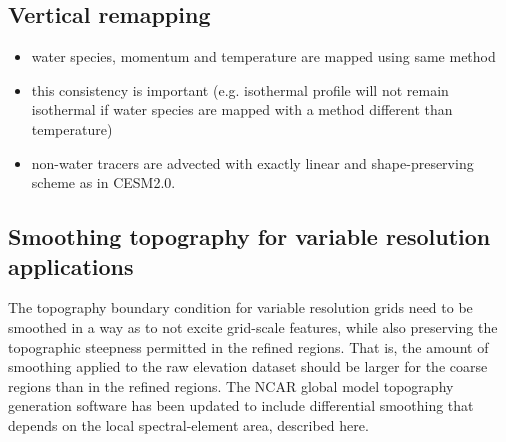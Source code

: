 \documentclass[draft]{agujournal2019}
\begin{document}
%
%
%

\subsection{Vertical remapping}
\begin{itemize}
\item water species, momentum and temperature are mapped using same method
\item this consistency is important (e.g. isothermal profile will not remain isothermal if water species are mapped with a method different than temperature)
\item non-water tracers are advected with exactly linear and shape-preserving scheme as in CESM2.0.
\end{itemize}
\subsection{Smoothing topography for variable resolution applications}
The topography boundary condition for variable resolution grids need to be smoothed in a way as to not excite grid-scale features, while also preserving the topographic steepness permitted in the refined regions. That is, the amount of smoothing applied to the raw elevation dataset should be larger for the coarse regions than in the refined regions. The NCAR global model topography generation software \cite{LetAl2015GMD} has been updated to include differential smoothing that depends on the local spectral-element area, described here. 
\end{document}
